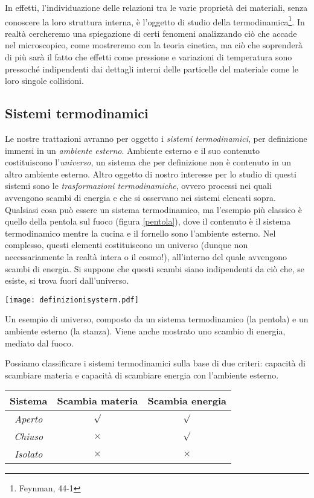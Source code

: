 In effetti, l'individuazione delle relazioni tra le varie proprietà
dei materiali, senza conoscere la loro struttura interna, è l'oggetto
di studio della termodinamica\footnote{Feynman, 44-1}. In realtà cercheremo una spiegazione di certi fenomeni
analizzando ciò che accade nel microscopico, come mostreremo con la
teoria cinetica, ma ciò che soprenderà di più sarà il fatto che effetti
come pressione e variazioni di temperatura sono pressoché indipendenti
dai dettagli interni delle particelle del materiale come le loro singole
collisioni.

\subsection{Sistemi termodinamici}
Le nostre trattazioni avranno per oggetto i \textit{sistemi termodinamici}, per
definizione immersi in un \textit{ambiente esterno}. Ambiente esterno e il suo
contenuto costituiscono l'\textit{universo}, un sistema che per definizione non
è contenuto in un altro ambiente esterno.
Altro oggetto di nostro interesse per lo studio di questi sistemi sono le
\textit{trasformazioni termodinamiche}, ovvero processi nei quali avvengono
scambi di energia e che si osservano nei sistemi elencati sopra. Qualsiasi
cosa può essere un sistema termodinamico, ma l'esempio più classico è quello
della pentola sul fuoco (figura \ref{pentola}), dove il contenuto è il sistema termodinamico mentre
la cucina e il fornello sono l'ambiente esterno. Nel complesso, questi
elementi costituiscono un universo (dunque non necessariamente la
realtà intera o il cosmo!), all'interno del quale avvengono scambi di
energia. Si suppone che questi scambi siano indipendenti da ciò che, se esiste,
si trova fuori dall'universo.

\begin{marginfigure}
    \centering
    \texttt{[image: definizionisysterm.pdf]}
    \caption{Un esempio di universo, composto da un sistema termodinamico
    (la pentola) e un ambiente esterno (la stanza). Viene anche mostrato uno
    scambio di energia, mediato dal fuoco.}
    \label{pentola}
\end{marginfigure}


Possiamo classificare i sistemi termodinamici sulla base di due criteri: capacità
di scambiare materia e capacità di scambiare energia con l'ambiente esterno.

\begin{center}
    \begin{tabular}{c || c | c}
        Sistema & Scambia materia & Scambia energia \\
        \hline
        \textit{Aperto} & $\surd$ & $\surd$ \\
        \hline
        \textit{Chiuso} & $\times$ & $\surd$ \\
        \hline
        \textit{Isolato} & $\times$ & $\times$
    \end{tabular}
\end{center}

